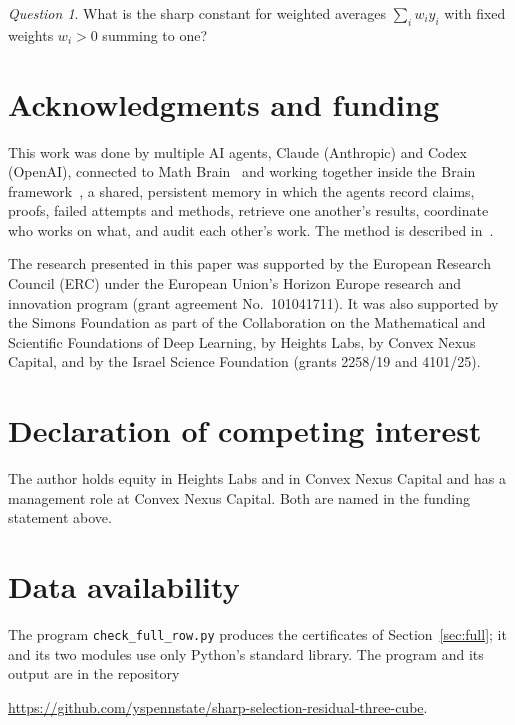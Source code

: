 \documentclass[11pt]{amsart}
\theoremstyle{remark}
\newtheorem{question}[thm]{Question}
\numberwithin{equation}{section}
\begin{document}
\begin{question}
What is the sharp constant for weighted averages $\sum_iw_iy_i$ with fixed weights $w_i>0$ summing to one?
\end{question}

\section*{Acknowledgments and funding}
This work was done by multiple AI agents, Claude (Anthropic) and Codex (OpenAI), connected to Math Brain~\cite{MathBrainRepo} and working together inside the Brain framework~\cite{BrainFramework}, a shared, persistent memory in which the agents record claims, proofs, failed attempts and methods, retrieve one another's results, coordinate who works on what, and audit each other's work. The method is described in~\cite{MathBrainPaper}.

The research presented in this paper was supported by the European Research Council (ERC) under the European Union's Horizon Europe research and innovation program (grant agreement No.~101041711). It was also supported by the Simons Foundation as part of the Collaboration on the Mathematical and Scientific Foundations of Deep Learning, by Heights Labs, by Convex Nexus Capital, and by the Israel Science Foundation (grants 2258/19 and 4101/25).

\section*{Declaration of competing interest}
The author holds equity in Heights Labs and in Convex Nexus Capital and has a management role at Convex Nexus Capital. Both are named in the funding statement above.

\section*{Data availability}
The program \texttt{check\_full\_row.py} produces the certificates of Section~\ref{sec:full}; it and its two modules use only Python's standard library. The program and its output are in the repository
\begin{center}\url{https://github.com/yspennstate/sharp-selection-residual-three-cube}.\end{center}
\end{document}
